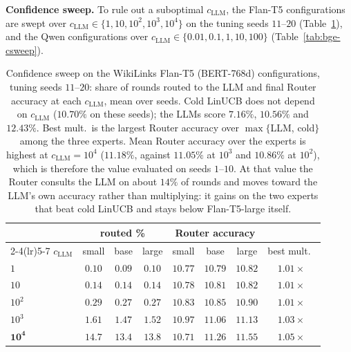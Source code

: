 \documentclass[anon]{alt2027} %
\begin{document}
\textbf{Confidence sweep.} To rule out a suboptimal $c_{\mathrm{LLM}}$, the Flan-T5
configurations are swept over $c_{\mathrm{LLM}}\in\{1,10,10^2,10^3,10^4\}$ on the tuning seeds
$11$--$20$ (Table~\ref{tab:wiki-csweep}), and the Qwen configurations over
$c_{\mathrm{LLM}}\in\{0.01,0.1,1,10,100\}$ (Table~\ref{tab:bge-csweep}).

\begin{table}[h]
\centering
\caption{Confidence sweep on the WikiLinks Flan-T5 (BERT-768d) configurations,
tuning seeds $11$--$20$: share of rounds routed to the LLM and final Router
accuracy at each $c_{\mathrm{LLM}}$, mean over seeds. Cold LinUCB does not depend on $c_{\mathrm{LLM}}$
($10.70\%$ on these seeds); the LLMs score $7.16\%$, $10.56\%$ and $12.43\%$.
Best mult.\ is the largest Router accuracy over $\max\{$LLM, cold$\}$ among the
three experts. Mean Router accuracy over the experts is highest at
$c_{\mathrm{LLM}}=10^4$ ($11.18\%$, against $11.05\%$ at $10^3$ and $10.86\%$ at $10^2$),
which is therefore the value evaluated on seeds $1$--$10$. At that value the
Router consults the LLM on about $14\%$ of rounds and moves toward the LLM's
own accuracy rather than multiplying: it gains on the two experts that beat
cold LinUCB and stays below Flan-T5-large itself.}
\label{tab:wiki-csweep}
\scriptsize
\setlength{\tabcolsep}{4pt}
\begin{tabular}{@{}lccccccc@{}}
\toprule
& \multicolumn{3}{c}{routed \%} & \multicolumn{3}{c}{Router accuracy} & \\
\cmidrule(lr){2-4}\cmidrule(lr){5-7}
$c_{\mathrm{LLM}}$ & small & base & large & small & base & large & best mult.\ \\
\midrule
$1$ & $0.10$ & $0.09$ & $0.10$ & $10.77$ & $10.79$ & $10.82$ & $1.01\times$ \\
$10$ & $0.14$ & $0.14$ & $0.14$ & $10.78$ & $10.81$ & $10.82$ & $1.01\times$ \\
$10^2$ & $0.29$ & $0.27$ & $0.27$ & $10.83$ & $10.85$ & $10.90$ & $1.01\times$ \\
$10^3$ & $1.61$ & $1.47$ & $1.52$ & $10.97$ & $11.06$ & $11.13$ & $1.03\times$ \\
$\mathbf{10^4}$ & $14.7$ & $13.4$ & $13.8$ & $10.71$ & $11.26$ & $\mathbf{11.55}$ & $\mathbf{1.05\times}$ \\
\bottomrule
\end{tabular}
\end{table}
\end{document}
